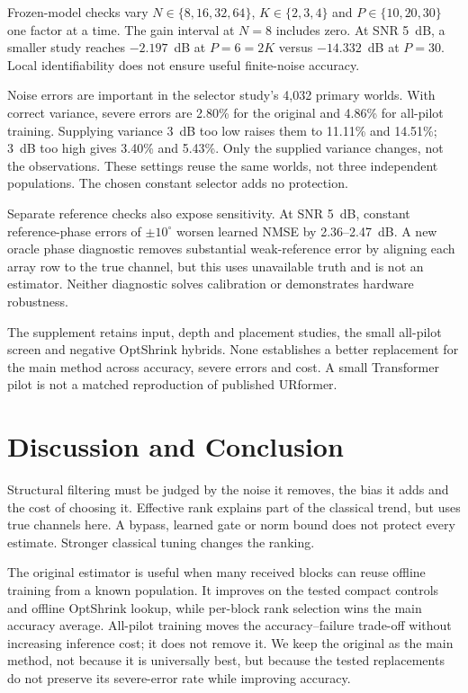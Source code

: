 \documentclass[10pt,journal,letterpaper]{IEEEtran}
\begin{document}
Frozen-model checks vary $N\in\{8,16,32,64\}$, $K\in\{2,3,4\}$ and $P\in\{10,20,30\}$ one factor at a time. The gain interval at $N=8$ includes zero. At SNR 5~dB, a smaller study reaches $-2.197$~dB at $P=6=2K$ versus $-14.332$~dB at $P=30$. Local identifiability does not ensure useful finite-noise accuracy.

Noise errors are important in the selector study's 4,032 primary worlds. With correct variance, severe errors are 2.80\% for the original and 4.86\% for all-pilot training. Supplying variance 3~dB too low raises them to 11.11\% and 14.51\%; 3~dB too high gives 3.40\% and 5.43\%. Only the supplied variance changes, not the observations. These settings reuse the same worlds, not three independent populations. The chosen constant selector adds no protection.

Separate reference checks also expose sensitivity. At SNR 5~dB, constant reference-phase errors of $\pm10^\circ$ worsen learned NMSE by 2.36--2.47~dB. A new oracle phase diagnostic removes substantial weak-reference error by aligning each array row to the true channel, but this uses unavailable truth and is not an estimator. Neither diagnostic solves calibration or demonstrates hardware robustness.

The supplement retains input, depth and placement studies, the small all-pilot screen and negative OptShrink hybrids. None establishes a better replacement for the main method across accuracy, severe errors and cost. A small Transformer pilot is not a matched reproduction of published URformer.

\section{Discussion and Conclusion}
Structural filtering must be judged by the noise it removes, the bias it adds and the cost of choosing it. Effective rank explains part of the classical trend, but uses true channels here. A bypass, learned gate or norm bound does not protect every estimate. Stronger classical tuning changes the ranking.

The original estimator is useful when many received blocks can reuse offline training from a known population. It improves on the tested compact controls and offline OptShrink lookup, while per-block rank selection wins the main accuracy average. All-pilot training moves the accuracy--failure trade-off without increasing inference cost; it does not remove it. We keep the original as the main method, not because it is universally best, but because the tested replacements do not preserve its severe-error rate while improving accuracy.
\end{document}
